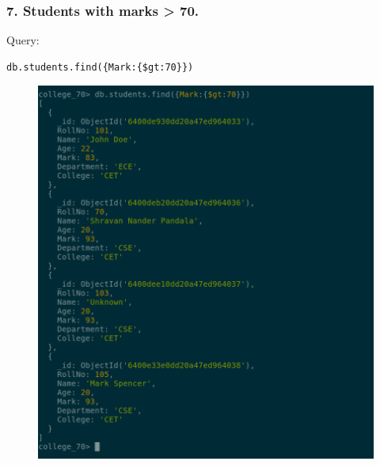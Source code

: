 \documentclass{article}
\begin{document}
\subsubsection*{7. Students with marks > 70.}
Query:
\begin{Verbatim}[frame=single,framerule=1pt,fontfamily=courier,fontsize=\small]
db.students.find({Mark:{$gt:70}})
\end{Verbatim}
\begin{figure}[H]
    \centering
    \includegraphics[width=\textwidth]{cycle7/7.7.png}
\end{figure}
\end{document}
